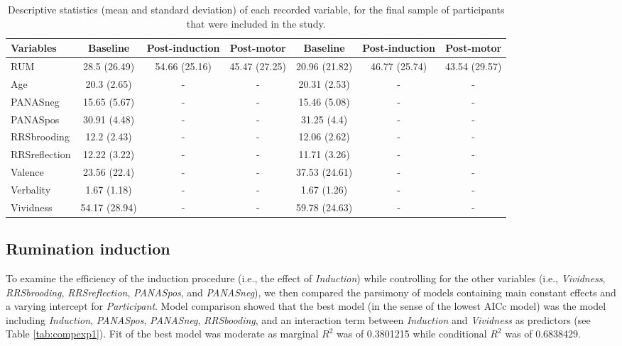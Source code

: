 \documentclass[12pt,]{book}
\theoremstyle{definition}
\theoremstyle{definition}
\theoremstyle{definition}
\theoremstyle{remark}
\begin{document}
\begin{table}

\caption{\label{tab:sumstat}Descriptive statistics (mean and standard deviation) of each recorded variable, for the final sample of participants that were included in the study.}
\centering
\begin{tabular}[t]{l|c|c|c|c|c|c}
\hline
Variables & Baseline & Post-induction & Post-motor & Baseline & Post-induction & Post-motor\\
\hline
RUM & 28.5 (26.49) & 54.66 (25.16) & 45.47 (27.25) & 20.96 (21.82) & 46.77 (25.74) & 43.54 (29.57)\\
\hline
Age & 20.3 (2.65) & - & - & 20.31 (2.53) & - & -\\
\hline
PANASneg & 15.65 (5.67) & - & - & 15.46 (5.08) & - & -\\
\hline
PANASpos & 30.91 (4.48) & - & - & 31.25 (4.4) & - & -\\
\hline
RRSbrooding & 12.2 (2.43) & - & - & 12.06 (2.62) & - & -\\
\hline
RRSreflection & 12.22 (3.22) & - & - & 11.71 (3.26) & - & -\\
\hline
Valence & 23.56 (22.4) & - & - & 37.53 (24.61) & - & -\\
\hline
Verbality & 1.67 (1.18) & - & - & 1.67 (1.26) & - & -\\
\hline
Vividness & 54.17 (28.94) & - & - & 59.78 (24.63) & - & -\\
\hline
\end{tabular}
\end{table}

\subsection{Rumination induction}\label{rumination-induction-2}

To examine the efficiency of the induction procedure (i.e., the effect
of \emph{Induction}) while controlling for the other variables (i.e.,
\emph{Vividness}, \emph{RRSbrooding}, \emph{RRSreflection},
\emph{PANASpos}, and \emph{PANASneg}), we then compared the parsimony of
models containing main constant effects and a varying intercept for
\emph{Participant}. Model comparison showed that the best model (in the
sense of the lowest AICc model) was the model including
\emph{Induction}, \emph{PANASpos}, \emph{PANASneg}, \emph{RRSbooding},
and an interaction term between \emph{Induction} and \emph{Vividness} as
predictors (see Table \ref{tab:compexp1}). Fit of the best model was
moderate as marginal \(R^{2}\) was of 0.3801215 while conditional
\(R^{2}\) was of 0.6838429.
\end{document}
